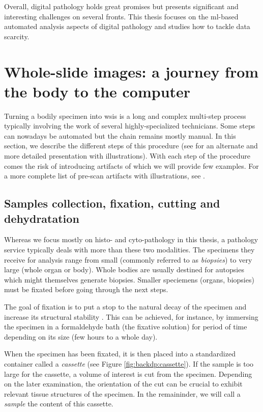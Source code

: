 Overall, digital pathology holds great promises but presents significant and interesting challenges on several fronts. This thesis focuses on the \acrshort{ml}-based automated analysis aspects of digital pathology and studies how to tackle data scarcity.

\section{Whole-slide images: a journey from the body to the computer}
\label{sec:backdp:wsi}

Turning a bodily specimen into \acrlong{wsi}s is a long and complex multi-step process typically involving the work of several highly-specialized technicians. Some steps can nowadays be automated but the chain remains mostly manual. In this section, we describe the different steps of this procedure (see \parencite{mccann2014automated} for an alternate and more detailed presentation with illustrations). With each step of the procedure comes the risk of introducing artifacts of which we will provide few examples. For a more complete list of pre-scan artifacts with illustrations, see \parencite{taqi2018review}. 


\subsection{Samples collection, fixation, cutting and dehydratation}

Whereas we focus mostly on histo- and cyto-pathology in this thesis, a pathology service typically deals with more than these two modalities. The specimens they receive for analysis range from small (commonly referred to as \textit{biopsies}) to very large (whole organ or body). Whole bodies are usually destined for autopsies which might themselves generate biopsies. Smaller speciemens (organs, biopsies) must be fixated before going through the next steps. 

The goal of fixation is to put a stop to the natural decay of the specimen and increase its structural stability \parencite{rolls2012process}. This can be achieved, for instance, by immersing the specimen in a formaldehyde bath (\ie the fixative solution) for period of time depending on its size (\ie few hours to a whole day). 

When the specimen has been fixated, it is then placed into a standardized container called a \textit{cassette} (see Figure \ref{fig:backdp:cassette}). If the sample is too large for the cassette, a volume of interest is cut from the specimen. Depending on the later examination, the orientation of the cut can be crucial to exhibit relevant tissue structures of the specimen. In the remaininder, we will call a \textit{sample} the content of this cassette.

